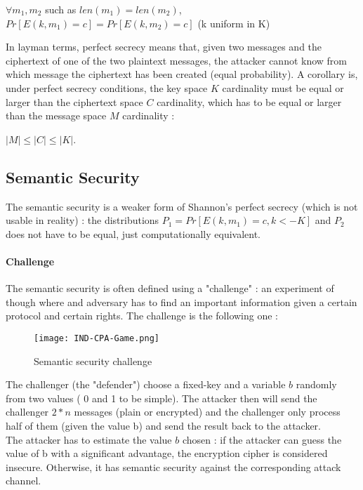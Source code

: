 \begin{mytheorem}
    $\forall m_1,m_2$ such as $len(m_1) = len(m_2)$, 
    $Pr[E(k,m_1) = c] = Pr[E(k,m_2) = c]$  \flushright (k uniform in K)
\end{mytheorem}

In layman terms, perfect secrecy means that, given two messages and the ciphertext of one of the two plaintext messages, the attacker cannot know from which message the ciphertext has been created (equal probability). A corollary is, under perfect secrecy conditions, the key space $K$ cardinality must be equal or larger than the ciphertext space $C$ cardinality, which has to be equal or larger than the message space $M$ cardinality :
\begin{mytheorem}
    $ |M| \leq |C| \leq |K| $. 
\end{mytheorem}


\subsection{Semantic Security}

The semantic security is a weaker form of Shannon's perfect secrecy (which is not usable in reality) : the distributions $P_1 = Pr[E(k,m_1) = c , k<- K]$ and $P_2$ does not have to be equal, just computationally equivalent.

\paragraph{Challenge}
The semantic security is often defined using a "challenge" : an experiment of though where and adversary has to find an important information given a certain protocol and certain rights. The challenge is the following one :

\begin{figure}[ht!]
	\centering
		\texttt{[image: IND-CPA-Game.png]}
	\caption{Semantic security challenge}
	\label{fig:SemanticSecurityChallenge}
\end{figure}

The challenger (the "defender") choose a fixed-key and a variable $b$ randomly from two values ( 0 and 1 to be simple). The attacker then will send the challenger $2*n$ messages (plain or encrypted) and the challenger only process half of them (given the value b) and send the result back to the attacker.\\
The attacker has to estimate the value $b$ chosen : if the attacker can guess the value of b with a significant advantage, the encryption cipher is considered insecure. Otherwise, it has semantic security against the corresponding attack channel.

